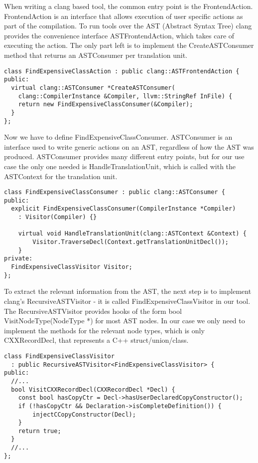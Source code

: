 \documentclass{article}
\begin{document}
When writing a clang based tool, the common entry point is the FrontendAction. FrontendAction is an interface that allows execution of user specific actions as part of the compilation. To run tools over the AST (Abstract Syntax Tree) clang provides the convenience interface ASTFrontendAction, which takes care of executing the action. The only part left is to implement the CreateASTConsumer method that returns an ASTConsumer per translation unit.

\begin{verbatim}
class FindExpensiveClassAction : public clang::ASTFrontendAction {
public:
  virtual clang::ASTConsumer *CreateASTConsumer(
  	clang::CompilerInstance &Compiler, llvm::StringRef InFile) {
    return new FindExpensiveClassConsumer(&Compiler);
  }
};
\end{verbatim}

Now we have to define FindExpensiveClassConsumer. ASTConsumer is an interface used to write generic actions on an AST, regardless of how the AST was produced. ASTConsumer provides many different entry points, but for our use case the only one needed is HandleTranslationUnit, which is called with the ASTContext for the translation unit.

\begin{verbatim}
class FindExpensiveClassConsumer : public clang::ASTConsumer {
public:
  explicit FindExpensiveClassConsumer(CompilerInstance *Compiler)
    : Visitor(Compiler) {}

    virtual void HandleTranslationUnit(clang::ASTContext &Context) {
        Visitor.TraverseDecl(Context.getTranslationUnitDecl());
    }
private:
  FindExpensiveClassVisitor Visitor;
};
\end{verbatim}

To extract the relevant information from the AST, the next step is to implement clang's RecursiveASTVisitor - it is called FindExpensiveClassVisitor in our tool.
The RecursiveASTVisitor provides hooks of the form bool VisitNodeType(NodeType *) for most AST nodes. In our case we only need to implement the methods for the relevant node types, which is only CXXRecordDecl, that represents a C++ struct/union/class.

\begin{verbatim}
class FindExpensiveClassVisitor
  : public RecursiveASTVisitor<FindExpensiveClassVisitor> {
public:
  //...
  bool VisitCXXRecordDecl(CXXRecordDecl *Decl) {
  	const bool hasCopyCtr = Decl->hasUserDeclaredCopyConstructor();   
    if (!hasCopyCtr && Declaration->isCompleteDefinition()) {
        injectCCopyConstructor(Decl);
    }
    return true;
  }
  //...  
};
\end{verbatim}
\end{document}
